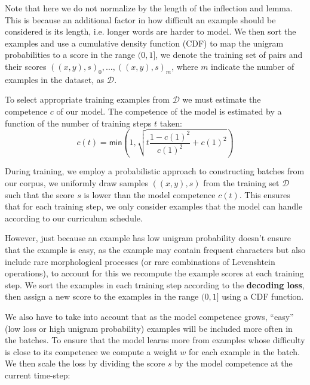 \documentclass[11pt,a4paper]{article}
\begin{document}
Note that here we do not normalize by the length of the inflection and
lemma. This is because an additional factor in how difficult an
example should be considered is its length, i.e. longer words are
harder to model.
%
We then sort the examples and use a cumulative density function (CDF)
to map the unigram probabilities to a score in the range $(0, 1]$, we
denote the training set of pairs and their scores
$((x,y), s)_0, \ldots, ((x,y), s)_m$, where $m$ indicate the number of
examples in the dataset, as $\mathcal{D}$.

% 
%
To select appropriate training examples from $\mathcal{D}$ we must
estimate the competence $c$ of our model. The competence of the model
is estimated by a function of the number of training steps $t$ taken:
%
%
%
\begin{equation}
    c(t) = \mathsf{min}\left(1, \sqrt{t\frac{1-c(1)^2}{c(1)^2}+c(1)^2}\right)
\end{equation}

During training, we employ a probabilistic approach to constructing
batches from our corpus, we uniformly draw samples $((x, y), s)$ from
the training set $\mathcal{D}$ such that the score $s$ is lower than
the model competence $c(t)$. This ensures that for each training
step, we only consider examples that the model can handle according
to our curriculum schedule.

However, just because an example has low unigram probability doesn't
ensure that the example is easy, as the example may contain frequent
characters but also include rare morphological processes (or rare
combinations of Levenshtein operations), to account for this we
recompute the example scores at each training step. We sort the
examples in each training step according to the \textbf{decoding
loss}, then assign a new score to the examples in the range
$(0, 1]$ using a CDF function.

We also have to take into account that as the model competence grows,
``easy'' (low loss or high unigram probability) examples will be
included more often in the batches. To ensure that the model learns
more from examples whose difficulty is close to its competence we
compute a weight $w$ for each example in the batch. We then scale the
loss by dividing the score $s$ by the model competence at the current
time-step:
\end{document}
